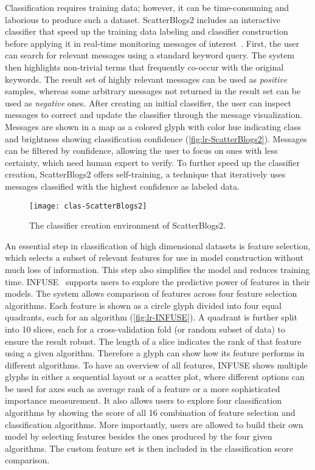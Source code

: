 Classification requires training data; however, it can be time-consuming and laborious to produce such a dataset. ScatterBlogs2 includes an interactive classifier that speed up the training data labeling and classifier construction before applying it in real-time monitoring messages of interest~\cite{Bosch2013}. First, the user can search for relevant messages using a standard keyword query. The system then highlights non-trivial terms that frequently co-occur with the original keywords. The result set of highly relevant messages can be used as \emph{positive} samples, whereas some arbitrary messages not returned in the result set can be used as \emph{negative} ones. After creating an initial classifier, the user can inspect messages to correct and update the classifier through the message visualization. Messages are shown in a map as a colored glyph with color hue indicating class and brightness showing classification confidence (\autoref{fig:lr-ScatterBlogs2}). Messages can be filtered by confidence, allowing the user to focus on ones with less certainty, which need human expert to verify. To further speed up the classifier creation, ScatterBlogs2 offers self-training, a technique that iteratively uses messages classified with the highest confidence as labeled data. 

\begin{figure}[!htb]
	\centering
	\texttt{[image: clas-ScatterBlogs2]}
	\caption{The classifier creation environment of ScatterBlogs2. }
	\label{fig:lr-ScatterBlogs2}
\end{figure}

An essential step in classification of high dimensional datasets is feature selection, which selects a subset of relevant features for use in model construction without much loss of information. This step also simplifies the model and reduces training time. INFUSE~\cite{Krause2014} supports users to explore the predictive power of features in their models. The system allows comparison of features across four feature selection algorithms. Each feature is shown as a circle glyph divided into four equal quadrants, each for an algorithm (\autoref{fig:lr-INFUSE}). A quadrant is further split into 10 slices, each for a cross-validation fold (or random subset of data) to ensure the result  robust. The length of a slice indicates the rank of that feature using a given algorithm. Therefore a glyph can show how its feature performs in different algorithms. To have an overview of all features, INFUSE shows multiple glyphs in either a sequential layout or a scatter plot, where different options can be used for axes such as average rank of a feature or a more sophisticated importance measurement. It also allows users to explore four classification algorithms by showing the score of all 16 combination of feature selection and classification algorithms. More importantly, users are allowed to build their own model by selecting features besides the ones produced by the four given algorithms. The custom feature set is then included in the classification score comparison.

